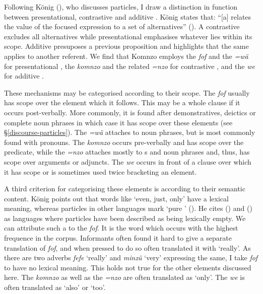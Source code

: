 Following König (\citeyear{Konig:1991vy}), who discusses  particles, I draw a distinction in function between presentational, contrastive and additive . König states that: ``[a]   relates the value of the focused expression to a set of alternatives'' (\citeyear[32]{Konig:1991vy}). A contrastive  excludes all alternatives while presentational  emphasises whatever lies within its scope. Additive  presuposes a previous proposition and highlights that the same applies to another referent. We find that Komnzo employs the  \emph{fof} and the  \emph{=wä} for presentational , the  \emph{komnzo} and the related  \emph{=nzo} for contrastive , and the  \emph{we} for additive .%

These mechanisms may be categorised according to their scope. The  \emph{fof} usually has scope over the element which it follows. This may be a whole clause if it occurs post-verbally. More commonly, it is found after demonstratives, deictics or complete noun phrases in which case it has scope over these elements (see \S{}\ref{discourse-particles}). The  \emph{=wä} attaches to noun phrases, but is most commonly found with pronouns. The  \emph{komnzo} occurs pre-verbally and has scope over the predicate, while the  \emph{=nzo} attaches mostly to s and noun phrases and, thus, has scope over arguments or adjuncts. The  \emph{we} occurs in front of a clause over which it has scope or is sometimes used twice bracketing an element.%

A third criterion for categorising these elements is according to their semantic content. König points out that  words like `even, just, only' have a lexical meaning, whereas  particles in other languages mark `pure ' (\citeyear[29ff.]{Konig:1991vy}). He cites  (\citealt[21ff.]{Saeed:1984wm}) and  (\citealt[476ff.]{Lichtenberk:1983vh}) as languages where  particles have been described as being lexically empty. We can attribute such a  to the  \emph{fof}. It is the word which occurs with the highest frequence in the corpus. Informants often found it hard to give a separate translation of \emph{fof}, and when pressed to do so often translated it with `really'. As there are two adverbs \emph{fefe} `really' and \emph{minzü} `very' expressing the same, I take \emph{fof} to have no lexical meaning. This holds not true for the other elements discussed here. The  \emph{komnzo} as well as the  \emph{=nzo} are often translated as `only'. The  \emph{we} is often translated as `also' or `too'.%

